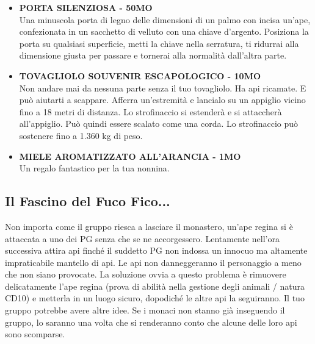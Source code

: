 \documentclass{article}
\begin{document}
\begin{itemize}
    \item \textbf{PORTA SILENZIOSA - 50MO} \\
    Una minuscola porta di legno delle dimensioni di un palmo con incisa un'ape, confezionata in un sacchetto di velluto con una chiave d'argento. Posiziona la porta su qualsiasi superficie, metti la chiave nella serratura, ti ridurrai alla dimensione giusta per passare e tornerai alla normalità dall'altra parte.
    
    \item \textbf{TOVAGLIOLO SOUVENIR ESCAPOLOGICO - 10MO} \\
    Non andare mai da nessuna parte senza il tuo tovagliolo. Ha api ricamate. E può aiutarti a scappare. Afferra un'estremità e lancialo su un appiglio vicino fino a 18 metri di distanza. Lo strofinaccio si estenderà e si attaccherà all’appiglio. Può quindi essere scalato come una corda. Lo strofinaccio può sostenere fino a 1.360 kg di peso.
    
    \item \textbf{MIELE AROMATIZZATO ALL'ARANCIA - 1MO} \\
    Un regalo fantastico per la tua nonnina.
\end{itemize}

\subsection{Il Fascino del Fuco Fico...} Non importa come il gruppo riesca a lasciare il monastero, un'ape regina si è attaccata a uno dei PG senza che se ne accorgessero.
Lentamente nell'ora successiva attira api finché il suddetto PG non indossa un innocuo ma altamente impraticabile mantello di api.
Le api non danneggeranno il personaggio a meno che non siano provocate.
La soluzione ovvia a questo problema è rimuovere delicatamente l'ape regina (prova di abilità nella gestione degli animali / natura CD10) e metterla in un luogo sicuro, dopodiché le altre api la seguiranno.
Il tuo gruppo potrebbe avere altre idee.
Se i monaci non stanno già inseguendo il gruppo, lo saranno una volta che si renderanno conto che alcune delle loro api sono scomparse.
\end{document}
